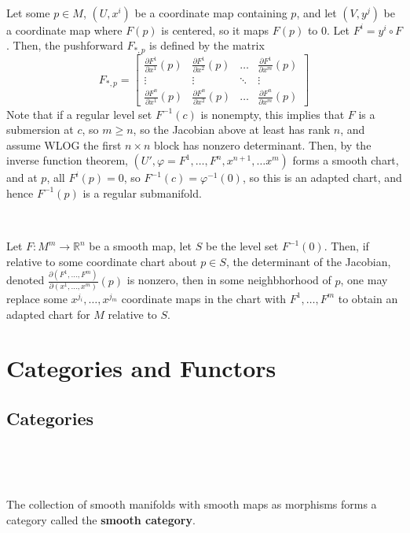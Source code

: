 \documentclass{article}
\begin{document}
\begin{customproof}
  \

  Let some $p \in M$, $(U, x^i)$ be a coordinate map containing $p$, and let $(V, y^j)$ be a coordinate map where $F(p)$ is centered, so it maps $F(p)$ to $0$. Let $F^i = y^i \circ F$. Then, the pushforward $F_{*,p}$ is defined by the matrix $$F_{*,p} =
  \begin{bmatrix}
    \frac{\partial F^1}{\partial x^1}(p)& \frac{\partial F^1}{\partial x^2}(p)& \dots& \frac{\partial F^1}{\partial x^m}(p)\\
    \vdots & \vdots & \ddots & \vdots\\
    \frac{\partial F^n}{\partial x^1}(p) & \frac{\partial F^n}{\partial x^2}(p) & \dots & \frac{\partial F^n}{\partial x^m}(p)
  \end{bmatrix}$$Note that if a regular level set $F ^{-1}(c)$ is nonempty, this implies that $F$ is a submersion at $c$, so $m \geq n$, so the Jacobian above at least has rank $n$, and assume WLOG the first $n \times n$ block has nonzero determinant. Then, by the inverse function theorem, $(U', \varphi = F^1, \dots, F^n, x^{n+1}, \dots x^m)$ forms a smooth chart, and at $p$, all $F^i(p) = 0$, so $F ^{-1}(c) = \varphi ^{-1}(0)$, so this is an adapted chart, and hence $F ^{-1}(p)$ is a regular submanifold.
\end{customproof}

\begin{lemma}
  \

  Let $F: M^m \to \mathbb{R}^n$ be a smooth map, let $S$ be the level set $F ^{-1}(0)$. Then, if relative to some coordinate chart about $p\in S$, the determinant of the Jacobian, denoted $\frac{\partial (F^1, \dots, F^m)}{\partial (x^1, \dots, x^m)}(p)$ is nonzero, then in some neighbhorhood of $p$, one may replace some $x^{j_i}, \dots, x^{j_m}$ coordinate maps in the chart with $F^1, \dots, F^m$ to obtain an adapted chart for $M$ relative to $S$.
\end{lemma}

\section{Categories and Functors}

\subsection{Categories}
\

\begin{example}
  \

  The collection of smooth manifolds with smooth maps as morphisms forms a category called the \textbf{smooth category}.
\end{example}
\end{document}
